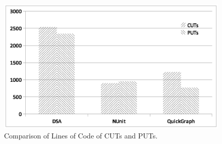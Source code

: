 \begin{figure}[t]
\centering
\includegraphics[scale=0.60,clip,trim=200 180 00 190]{charts/LOC_1.eps}\vspace*{-3ex}
\caption{\label{fig:loccomp}Comparison of Lines of Code of CUTs and PUTs.} \vspace*{-3.5ex}
\end{figure}

